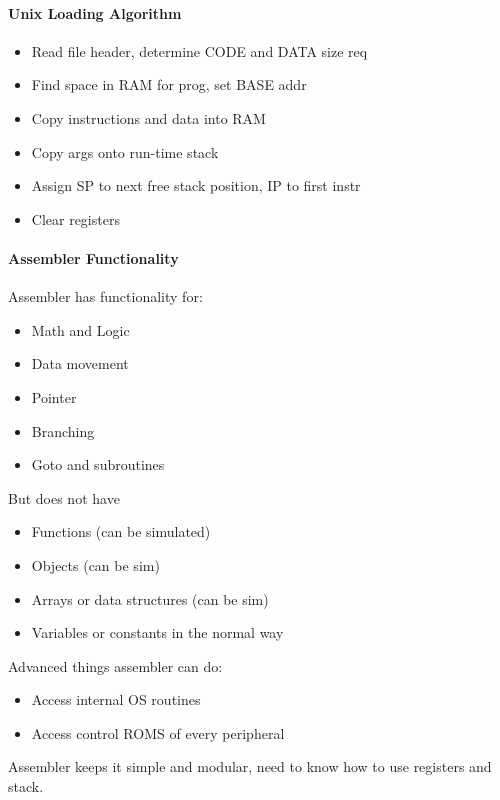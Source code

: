\documentclass[12 pt]{article}
\begin{document}
\paragraph{Unix Loading Algorithm}
\begin{itemize}
\item Read file header, determine CODE and DATA size req
\item Find space in RAM for prog, set BASE addr
\item Copy instructions and data into RAM
\item Copy args onto run-time stack
\item Assign SP to next free stack position, IP to first instr
\item Clear registers
\end{itemize}
\paragraph{Assembler Functionality}
Assembler has functionality for:
\begin{itemize}
\item Math and Logic
\item Data movement
\item Pointer
\item Branching
\item Goto and subroutines
\end{itemize}
But does not have
\begin{itemize}
\item Functions (can be simulated)
\item Objects (can be sim)
\item Arrays or data structures (can be sim)
\item Variables or constants in the normal way
\end{itemize}
Advanced things assembler can do:
\begin{itemize}
\item Access internal OS routines
\item Access control ROMS of every peripheral
\end{itemize}
Assembler keeps it simple and modular, need to know how to use registers and stack.
\end{document}
